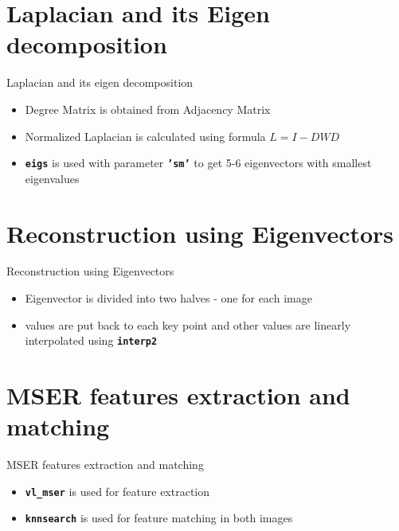 \documentclass{beamer}
\begin{document}
\section{Laplacian and its Eigen decomposition}
\begin{frame}{Laplacian and its eigen decomposition}
\begin{itemize}

\item Degree Matrix is obtained from Adjacency Matrix
\item Normalized Laplacian is calculated using formula $L = I - DWD$
\item \textbf{\texttt{eigs}} is used with parameter \textbf{\texttt{'sm'}} to get 5-6 eigenvectors with smallest eigenvalues

\end{itemize}
\end{frame}


\section{Reconstruction using Eigenvectors}
\begin{frame}{Reconstruction using Eigenvectors}
\begin{itemize}

\item Eigenvector is divided into two halves - one for each image
\item values are put back to each key point and other values are linearly interpolated using \textbf{\texttt{interp2}}

\end{itemize}
\end{frame}


\section{MSER features extraction and matching}
\begin{frame}{MSER features extraction and matching}
\begin{itemize}
	\item \textbf{\texttt{vl\_mser}} is used for feature extraction
    \item \textbf{\texttt{knnsearch}} is used for feature matching in both images
\end{itemize}
\end{frame}
\end{document}
